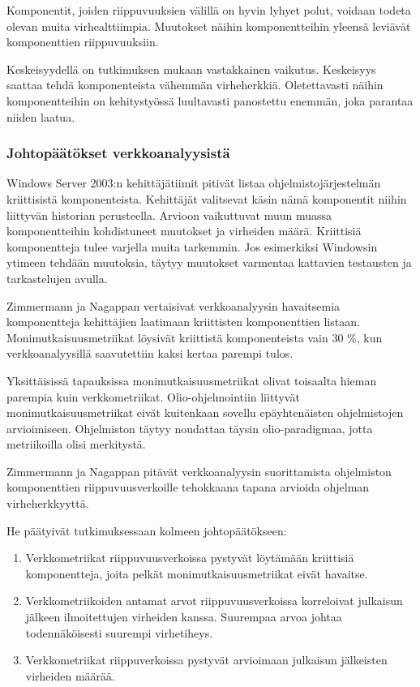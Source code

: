\documentclass[finnish]{../tktltiki2}
\theoremstyle{definition}
\theoremstyle{remark}
\begin{document}
\begin{enumerate}
    Komponentit, joiden riippuvuuksien välillä on hyvin lyhyet polut, voidaan todeta olevan muita virhealttiimpia. 
    Muutokset näihin komponentteihin yleensä leviävät komponenttien riippuvuuksiin.
    
    Keskeisyydellä on tutkimuksen mukaan vastakkainen vaikutus. Keskeisyys saattaa tehdä komponenteista vähemmän 
    virheherkkiä. Oletettavasti näihin komponentteihin on kehitystyössä luultavasti panostettu enemmän, joka parantaa 
    niiden laatua.
    
\end{enumerate}

\subsubsection{Johtopäätökset verkkoanalyysistä}

Windows Server 2003:n kehittäjätiimit pitivät listaa ohjelmistojärjestelmän kriittisistä komponenteista. Kehittäjät 
valitsevat käsin nämä komponentit niihin liittyvän historian perusteella. Arvioon vaikuttuvat muun muassa 
komponentteihin kohdistuneet muutokset ja virheiden määrä. Kriittisiä komponentteja tulee varjella muita tarkemmin. 
Jos esimerkiksi Windowsin ytimeen tehdään muutoksia, täytyy muutokset varmentaa kattavien testausten ja tarkastelujen 
avulla.

    Zimmermann ja Nagappan vertaisivat verkkoanalyysin havaitsemia komponentteja kehittäjien laatimaan kriittisten 
komponenttien listaan. Monimutkaisuusmetriikat löysivät kriittistä komponenteista vain 30 \%, kun verkkoanalyysillä 
saavutettiin kaksi kertaa parempi tulos.

    Yksittäisissä tapauksissa monimutkaisuusmetriikat olivat toisaalta hieman parempia kuin verkkometriikat. 
Olio-ohjelmointiin liittyvät monimutkaisuusmetriikat eivät kuitenkaan sovellu epäyhtenäisten ohjelmistojen arvioimiseen. 
Ohjelmiston täytyy noudattaa täysin olio-paradigmaa, jotta metriikoilla olisi merkitystä.

    Zimmermann ja Nagappan pitävät verkkoanalyysin suorittamista ohjelmiston komponenttien riippuvuusverkoille 
tehokkaana tapana arvioida ohjelman virheherkkyyttä.\newline

\noindent He päätyivät tutkimuksessaan kolmeen johtopäätökseen:

\begin{enumerate}

    \item Verkkometriikat riippuvuusverkoissa pystyvät löytämään kriittisiä komponentteja, joita pelkät 
          monimutkaisuusmetriikat eivät havaitse.
          
    \item Verkkometriikoiden antamat arvot riippuvuusverkoissa korreloivat julkaisun jälkeen ilmoitettujen virheiden 
          kanssa. Suurempaa arvoa johtaa todennäköisesti suurempi virhetiheys.
          
    \item Verkkometriikat riippuverkoissa pystyvät arvioimaan julkaisun jälkeisten virheiden määrää.

\end{enumerate}
\end{document}
